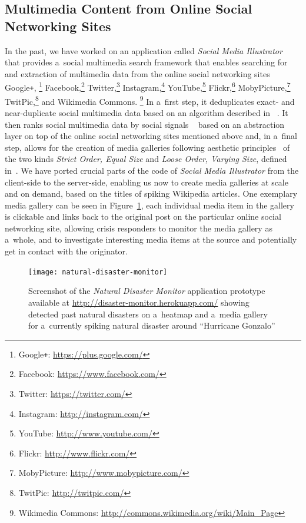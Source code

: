 \documentclass[letterpaper]{article}
\begin{document}
\subsection{Multimedia Content from Online Social Networking Sites}

In the past, we have worked on an application called
\emph{Social Media Illustrator}~\cite{steiner2014thesis}
that provides a~social multimedia search framework
that enables searching for and extraction of
multimedia data from the online social networking sites
Google\texttt{+},%
\footnote{Google\texttt{+}: \url{https://plus.google.com/}}
Facebook,\footnote{Facebook: \url{https://www.facebook.com/}}
Twitter,\footnote{Twitter: \url{https://twitter.com/}}
Instagram,\footnote{Instagram: \url{http://instagram.com/}}
YouTube,\footnote{YouTube: \url{http://www.youtube.com/}}
Flickr,\footnote{Flickr: \url{http://www.flickr.com/}}
MobyPicture,\footnote{MobyPicture: \url{http://www.mobypicture.com/}}
TwitPic,\footnote{TwitPic: \url{http://twitpic.com/}}
and Wikimedia Commons.%
\footnote{Wikimedia Commons: \url{http://commons.wikimedia.org/wiki/Main_Page}}
In a~first step, it deduplicates exact- and near-duplicate
social multimedia data based on an algorithm described in%
~\cite{steiner2013clustering}.
It then ranks social multimedia data by social signals%
~\cite{steiner2014thesis} based on an abstraction layer
on top of the online social networking sites mentioned above
and, in a~final step, allows for the creation of media galleries
following aesthetic principles~\cite{steiner2014thesis}
of the two kinds \emph{Strict Order, Equal Size}
and \emph{Loose Order, Varying Size},
defined in~\cite{steiner2014thesis}.
We have ported crucial parts
of the code of \emph{Social Media Illustrator}
from the client-side to the server-side,
enabling us now to create media galleries at scale and on demand,
based on the titles of spiking Wikipedia articles.
One exemplary media gallery can be seen in Figure~\ref{fig:screenshot},
each individual media item in the gallery is clickable
and links back to the original post
on the particular online social networking site,
allowing crisis responders to monitor the media gallery as a~whole,
and to investigate interesting media items at the source
and potentially get in contact with the originator.

\begin{figure}[b!]
  \centering
  \texttt{[image: natural-disaster-monitor]}
  \caption{Screenshot of the \emph{Natural Disaster Monitor} application
    prototype available at \url{http://disaster-monitor.herokuapp.com/}
    showing detected past natural disasters on a~heatmap and a~media gallery for
    a~currently spiking natural disaster around ``Hurricane Gonzalo''}
  \label{fig:screenshot}
\end{figure}
\end{document}
